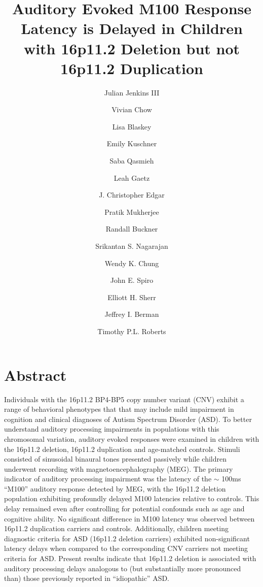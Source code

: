 \documentclass{article}
\begin{document}
\title{\textbf{Auditory Evoked M100 Response Latency is Delayed in Children with 16p11.2 Deletion but not 16p11.2 Duplication}}


\author{Julian Jenkins III\and Vivian Chow\and Lisa Blaskey\and Emily Kuschner\and Saba Qasmieh\and Leah Gaetz\and J. Christopher Edgar\and Pratik Mukherjee\and Randall Buckner\and Srikantan S. Nagarajan\and Wendy K. Chung\and John E.  Spiro\and Elliott H. Sherr\and Jeffrey I. Berman\and Timothy P.L. Roberts}

\date{}

\maketitle
\tableofcontents



\pagebreak

\section{Abstract}

Individuals with the 16p11.2 BP4-BP5 copy number variant (CNV) exhibit a range of behavioral phenotypes that that may include mild impairment in cognition and clinical diagnoses of Autism Spectrum Disorder (ASD). To better understand auditory processing impairments in populations with this chromosomal variation, auditory evoked responses were examined in children with the 16p11.2 deletion, 16p11.2 duplication and age-matched controls. Stimuli consisted of sinusoidal binaural tones presented passively while children underwent recording with magnetoencephalography (MEG). The primary indicator of auditory processing impairment was the latency of the $\sim$ 100ms “M100” auditory response detected by MEG, with the 16p11.2 deletion population exhibiting profoundly delayed M100 latencies relative to controls. This delay remained even after controlling for potential confounds such as age and cognitive ability.  No significant difference in M100 latency was observed between 16p11.2 duplication carriers and controls. Additionally, children meeting diagnostic criteria for ASD (16p11.2 deletion carriers) exhibited non-significant latency delays when compared to the corresponding CNV carriers not meeting criteria for ASD. Present results indicate that 16p11.2 deletion is associated with auditory processing delays analogous to (but substantially more pronounced than) those previously reported in “idiopathic” ASD.  
\end{document}
